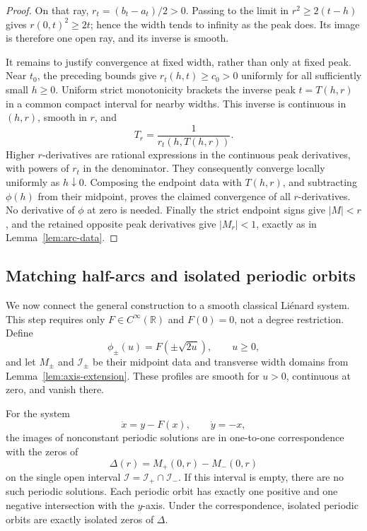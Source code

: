 \begin{proof}
On that ray, \(r_t=(b_t-a_t)/2>0\). Passing to the limit in
\(r^2\ge2(t-h)\) gives \(r(0,t)^2\ge2t\); hence the width tends to
infinity as the peak does. Its image is therefore one open ray,
and its inverse is smooth.

It remains to justify convergence at fixed width, rather than only
at fixed peak. Near \(t_0\), the preceding bounds give
\(r_t(h,t)\ge c_0>0\) uniformly for all sufficiently small
\(h\ge0\). Uniform strict monotonicity brackets the inverse peak
\(t=T(h,r)\) in a common compact interval for nearby widths.
This inverse is continuous in \((h,r)\), smooth in \(r\), and
\[
  T_r=\frac1{r_t(h,T(h,r))}.
\]
Higher \(r\)-derivatives are rational expressions in the continuous
peak derivatives, with powers of \(r_t\) in the denominator.
They consequently converge locally uniformly as \(h\downarrow0\).
Composing the endpoint data with \(T(h,r)\), and subtracting
\(\phi(h)\) from their midpoint, proves the claimed convergence of
all \(r\)-derivatives. No derivative of \(\phi\) at zero is needed.
Finally the strict endpoint signs give \(|M|<r\), and the retained
opposite peak derivatives give \(|M_r|<1\), exactly as in
Lemma~\ref{lem:arc-data}.
\end{proof}

\subsection{Matching half-arcs and isolated periodic orbits}

We now connect the general construction to a smooth classical
Liénard system. This step requires only \(F\in C^\infty(\mathbb R)\)
and \(F(0)=0\), not a degree restriction. Define
\[
  \phi_\pm(u)=F(\pm\sqrt{2u}),\qquad u\ge0,
\]
and let \(M_\pm\) and \(\mathcal I_\pm\) be their midpoint data and
transverse width domains from Lemma~\ref{lem:axis-extension}.
These profiles are smooth for \(u>0\), continuous at zero, and vanish
there.

\begin{proposition}\label{prop:cycle-matching}
For the system
\begin{equation}\label{eq:arc-lienard-system}
  \dot x=y-F(x),\qquad \dot y=-x,
\end{equation}
the images of nonconstant periodic solutions are in one-to-one
correspondence with the zeros of
\begin{equation}\label{eq:cycle-matching}
  \Delta(r)=M_+(0,r)-M_-(0,r)
\end{equation}
on the single open interval
\(\mathcal I=\mathcal I_+\cap\mathcal I_-\).
If this interval is empty, there are no such periodic solutions.
Each periodic orbit has exactly one positive and one negative
intersection with the \(y\)-axis. Under the correspondence,
isolated periodic orbits are exactly isolated zeros of \(\Delta\).
\end{proposition}

